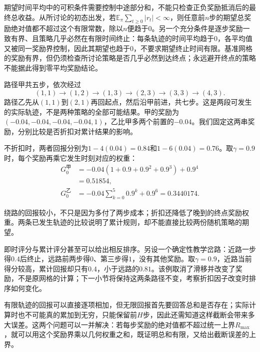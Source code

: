 期望时间平均中的可积条件需要控制中途部分和，不能只检查正负奖励抵消后的最终总收益。从所讨论的初态出发，若$\mathbb E_\pi\sum_{t\geq0}|r_t|<\infty$，则任意前$n$步的期望总奖励绝对值都不超过这个有限常数，除以$n$便趋于0。另一个充分条件是逐步奖励一致有界、且策略几乎必然在有限时间终止：每条轨迹的时间平均趋于0，各平均值又被同一奖励界控制，因此其期望也趋于0，不要求期望终止时间有限。基准网格的奖励有界，但仍须检查所讨论策略是否几乎必然到达终点；永远避开终点的策略不能据此得到零平均奖励结论。

\begin{example}[同一网格上的两条到达轨迹]
  \label{ex:rl-overview-path-returns}
  路径甲共五步，依次经过
  \[
    (1,1)\to(1,2)\to(1,3)\to(2,3)\to(3,3)\to(4,3).
  \]
  路径乙先从$(1,1)$到$(2,1)$再回起点，然后沿甲前进，共七步。这是两段可发生的实际轨迹，不是两种策略的全部可能结果。甲的奖励为$(-0.04,-0.04,-0.04,-0.04,1)$，乙比甲多两个前置的$-0.04$。我们固定这两串奖励，分别比较是否折扣对累计结果的影响。

  不折扣时，两者回报分别为$1-4(0.04)=0.84$和$1-6(0.04)=0.76$。取$\gamma=0.9$时，每个奖励再乘它发生时刻对应的权重：
  \[
  \begin{aligned}
    G_0^{\text{甲}}&=-0.04(1+0.9+0.9^2+0.9^3)+0.9^4\\
                  &=0.51854,\\
    G_0^{\text{乙}}&=-0.04\sum_{k=0}^{5}0.9^k+0.9^6
                    =0.3440174.
  \end{aligned}
  \]
\end{example}

绕路的回报较小，不只是因为多付了两步成本；折扣还降低了晚到的终点奖励权重。两条已发生轨迹的比较说明了累计规则，却不能直接比较两份随机策略的期望。

即时评分与累计评分甚至可以给出相反排序。另设一个确定性教学岔路：近路一步得$0.4$后终止，远路前两步得$0$、第三步得$1$，没有其他奖励。取$\gamma=0.9$，近路当前得分较高，累计回报却只有$0.4$，小于远路的$0.81$。该例取消了滑移并改变了奖励，不是原网格的计算；下一小节将保持这两条路径不变，考察折扣因子改变时排序如何变化。

有限轨迹的回报可以直接逐项相加，但无限回报首先要回答总和是否存在；实际计算时也不可能真的累加到无穷，只能保留前$H$步，因此还需知道这样截断会带来多大误差。这两个问题可以一并解决：若每步奖励的绝对值都不超过统一上界$R_{\max}$，就可以用这个奖励界乘以几何权重之和，既证明总和有限，又给出截断误差的上界。

